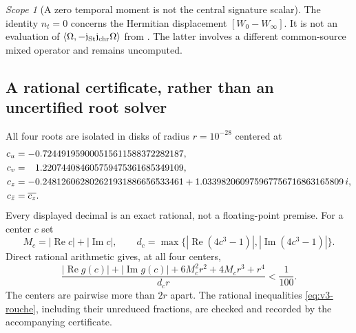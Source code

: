 \documentclass[11pt]{article}
\theoremstyle{definition}
\theoremstyle{remark}
\newtheorem{scope}[scope]{Scope}
\begin{document}
\begin{scope}[A zero temporal moment is not the central signature scalar]
The identity $n_t=0$ concerns the Hermitian displacement
$[W_0-W_\infty]$. It is not an evaluation of
$\langle\Omega,-\mathfrak j_{\rm St}\mathfrak j_{\rm chr}\Omega\rangle$
from \cite{AD9}. The latter involves a different common-source mixed
operator and remains uncomputed.
\end{scope}

\subsection{A rational certificate, rather than an uncertified root solver}
All four roots are isolated in disks of radius $r=10^{-28}$ centered at
\begin{align}
 c_u&=-0.724491959000515611588372282187,\notag\\
 c_v&=\phantom{-}1.220744084605759475361685349109,\notag\\
 c_z&=-0.248126062802621931886656533461
       +1.033982060975967756716863165809\,i,\notag\\
 c_{\bar z}&=\overline{c_z}.
 \label{eq:v3-root-centers}
\end{align}
Every displayed decimal is an exact rational, not a floating-point premise.
For a center $c$ set
\[
 M_c=|\operatorname{Re}c|+|\operatorname{Im}c|,\qquad
 d_c=\max\{|\operatorname{Re}(4c^3-1)|,
                  |\operatorname{Im}(4c^3-1)|\}.
\]
Direct rational arithmetic gives, at all four centers,
\begin{equation}
 \boxed{\displaystyle
 \frac{|\operatorname{Re}g(c)|+|\operatorname{Im}g(c)|
           +6M_c^2r^2+4M_cr^3+r^4}{d_cr}<\frac1{100}.}
 \label{eq:v3-rouche}
\end{equation}
The centers are pairwise more than $2r$ apart. The rational inequalities
\eqref{eq:v3-rouche}, including their unreduced fractions, are checked and
recorded by the accompanying certificate.
\end{document}
